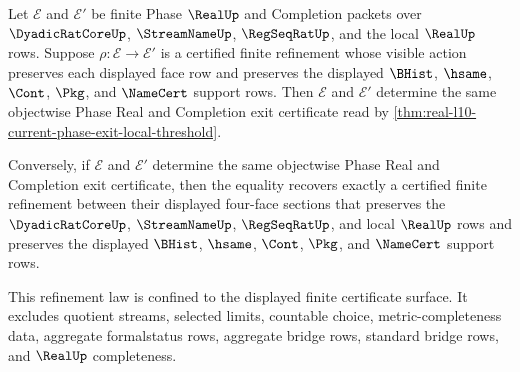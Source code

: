 \begin{theorem}
\label{thm:real-l10-exit-certificate-refinement-functoriality}
Let $\mathcal E$ and $\mathcal E'$ be finite Phase $\RealUp$ and Completion packets over $\DyadicRatCoreUp$, $\StreamNameUp$, $\RegSeqRatUp$, and the local $\RealUp$ rows. Suppose $\rho : \mathcal E \to \mathcal E'$ is a certified finite refinement whose visible action preserves each displayed face row and preserves the displayed $\BHist$, $\hsame$, $\Cont$, $\Pkg$, and $\NameCert$ support rows. Then $\mathcal E$ and $\mathcal E'$ determine the same objectwise Phase Real and Completion exit certificate read by \autoref{thm:real-l10-current-phase-exit-local-threshold}.

Conversely, if $\mathcal E$ and $\mathcal E'$ determine the same objectwise Phase Real and Completion exit certificate, then the equality recovers exactly a certified finite refinement between their displayed four-face sections that preserves the $\DyadicRatCoreUp$, $\StreamNameUp$, $\RegSeqRatUp$, and local $\RealUp$ rows and preserves the displayed $\BHist$, $\hsame$, $\Cont$, $\Pkg$, and $\NameCert$ support rows.

This refinement law is confined to the displayed finite certificate surface. It excludes quotient streams, selected limits, countable choice, metric-completeness data, aggregate formalstatus rows, aggregate bridge rows, standard bridge rows, and $\RealUp$ completeness.
\end{theorem}
